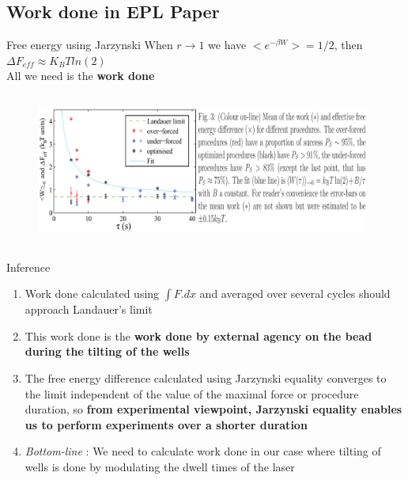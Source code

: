 \documentclass{beamer}
\begin{document}
\subsection{Work done in EPL Paper}
\begin{frame}{Free energy using Jarzynski} 
When $r \rightarrow 1$ we have $<e^{-\beta W}> = 1/2$, then $\Delta F_{eff} \approx K_BT ln(2)$\\ All we need is the \textbf{work done} 
\begin{figure}
    \centering
    \includegraphics[height=5cm,width=11cm]{EPL_landauer_fig1.eps}
    \label{fig:graph5}
\end{figure}

\end{frame}
\begin{frame}{Inference}
 
\begin{enumerate}

\item Work done calculated using $\int F .dx$ and averaged over several cycles should approach Landauer's limit
\item This work done is the \textbf{work done by external agency on the bead during the tilting of the wells}
\item The free energy difference calculated using Jarzynski equality converges to the limit independent of the value of the maximal force or procedure duration, so \textbf{from experimental viewpoint, Jarzynski equality enables us to perform experiments over a shorter duration}
\item \textit{Bottom-line} : We need to calculate work done in our case where tilting of wells is done by modulating the dwell times of the laser

\end{enumerate}

\end{frame}
\end{document}
